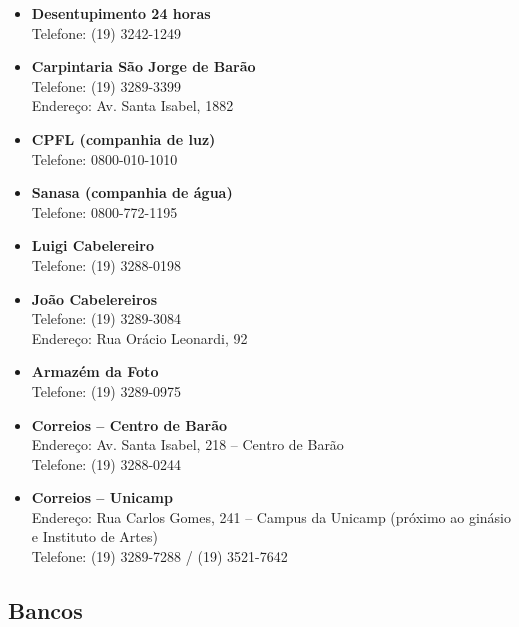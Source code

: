 \begin{itemize}
\item  \textbf{Desentupimento 24 horas}
		\\Telefone: (19) 3242-1249

\item  \textbf{Carpintaria São Jorge de Barão}
		\\Telefone: (19) 3289-3399
		\\Endereço: Av. Santa Isabel, 1882

\item  \textbf{CPFL (companhia de luz)}
		\\Telefone: 0800-010-1010

\item  \textbf{Sanasa (companhia de água)}
		\\Telefone: 0800-772-1195

\item  \textbf{Luigi Cabelereiro}
		\\Telefone: (19) 3288-0198

\item  \textbf{João Cabelereiros}
		\\Telefone: (19) 3289-3084
		\\Endereço: Rua Orácio Leonardi, 92

\item  \textbf{Armazém da Foto}
		\\Telefone: (19) 3289-0975

\item  \textbf{Correios -- Centro de Barão}
		\\Endereço: Av. Santa Isabel, 218 -- Centro de Barão
		\\Telefone: (19) 3288-0244

\item  \textbf{Correios -- Unicamp}
		\\Endereço: Rua Carlos Gomes, 241 -- Campus da Unicamp (próximo ao
       ginásio e Instituto de Artes)
		\\Telefone: (19) 3289-7288 / (19) 3521-7642
\end{itemize}

\subsection{Bancos}

